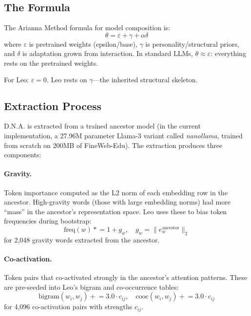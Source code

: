 \documentclass[11pt,twocolumn]{article}
\begin{document}
\subsection{The Formula}

The Arianna Method formula for model composition is:
\begin{equation}
\label{eq:theta}
  \theta = \varepsilon + \gamma + \alpha\delta
\end{equation}
where $\varepsilon$ is pretrained weights (epsilon/base), $\gamma$ is personality/structural priors, and $\delta$ is adaptation grown from interaction. In standard LLMs, $\theta \approx \varepsilon$: everything rests on the pretrained weights.

For Leo: $\varepsilon = 0$. Leo rests on $\gamma$---the inherited structural skeleton.

\subsection{Extraction Process}

D.N.A. is extracted from a trained ancestor model (in the current implementation, a 27.96M parameter Llama-3 variant called \textit{nanollama}, trained from scratch on 200MB of FineWeb-Edu). The extraction produces three components:

\paragraph{Gravity.} Token importance computed as the L2 norm of each embedding row in the ancestor. High-gravity words (those with large embedding norms) had more ``mass'' in the ancestor's representation space. Leo uses these to bias token frequencies during bootstrap:
\begin{equation}
  \text{freq}(w) \mathrel{*}= 1 + g_w, \quad g_w = \|e_w^{\text{ancestor}}\|_2
\end{equation}
for 2,048 gravity words extracted from the ancestor.

\paragraph{Co-activation.} Token pairs that co-activated strongly in the ancestor's attention patterns. These are pre-seeded into Leo's bigram and co-occurrence tables:
\begin{equation}
  \text{bigram}(w_i, w_j) \mathrel{+}= 3.0 \cdot c_{ij}, \quad
  \text{cooc}(w_i, w_j) \mathrel{+}= 3.0 \cdot c_{ij}
\end{equation}
for 4,096 co-activation pairs with strengths $c_{ij}$.
\end{document}
